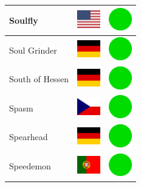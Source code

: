 \documentclass[12pt, a4paper, twoside]{report}
\begin{document}
\begin{center}
\begin{longtable}{|p{5cm}|p{2cm}|p{2cm}|}
 Soulfly                                                    & \includegraphics[width=1cm]{../4x3/us} &   \includegraphics[width=1cm]{../likes/y} \\ \hline
 Soul Grinder                                               & \includegraphics[width=1cm]{../4x3/de} &   \includegraphics[width=1cm]{../likes/y} \\ \hline
 South of Hessen                                            & \includegraphics[width=1cm]{../4x3/de} &   \includegraphics[width=1cm]{../likes/y} \\ \hline
 Spasm                                                      & \includegraphics[width=1cm]{../4x3/cz} &   \includegraphics[width=1cm]{../likes/y} \\ \hline
 Spearhead                                                  & \includegraphics[width=1cm]{../4x3/de} &   \includegraphics[width=1cm]{../likes/y} \\ \hline
 Speedemon                                                  & \includegraphics[width=1cm]{../4x3/pt} &   \includegraphics[width=1cm]{../likes/y} \\ \hline

\end{longtable}
\end{center}
\end{document}
